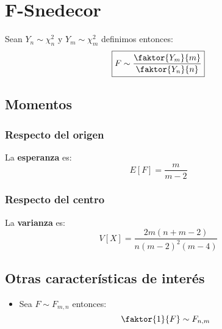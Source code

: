 \section{F-Snedecor}
\label{sec:f_snedecor}
Sean $Y_n \sim \chi^2_n$ y $Y_m \sim \chi^2_m$ definimos entonces:
\[
\boxed{F \sim \frac{\faktor{Y_m}{m}}{\faktor{Y_n}{n}}}
\]

\subsection{Momentos}

\subsubsection*{Respecto del origen}
La \textbf{esperanza} es: 
\[
    E\left[ F \right] = \frac{m}{m - 2}
\]
\subsubsection*{Respecto del centro}
La \textbf{varianza} es:
\[
    V\left[ X \right] = \frac{2 m \left( n + m - 2 \right)}{n \left( m - 2 \right)^2 \left( m - 4 \right)}
\]

\subsection{Otras características de interés}
\begin{itemize}
    \item Sea $F \sim F_{m, n}$ entonces:
    \[
    \faktor{1}{F} \sim F_{n, m}
    \]
\end{itemize}
